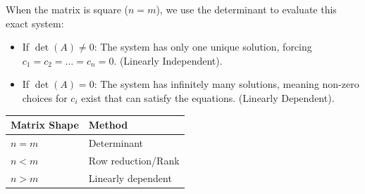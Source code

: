 \documentclass[DIV=20,oneside]{scrartcl}
\begin{document}
When the matrix is square ($n = m$), we use the determinant to evaluate this exact system:
\begin{itemize}
	\item If $\det(A) \neq 0$: The system has only one unique solution, forcing $c_1 = c_2 = \dots = c_n = 0$. (Linearly Independent).
	\item If $\det(A) = 0$: The system has infinitely many solutions, meaning non-zero choices for $c_i$ exist that can satisfy the equations. (Linearly Dependent).
\end{itemize}

\begin{table}[H]
	\centering
	\begin{tabular}{|l|l|}
		\hline
		\textbf{Matrix Shape} & \textbf{Method}\\ \hline
		$n=m$ & Determinant\\ \hline
		$n<m$ & Row reduction/Rank\\ \hline
		$n>m$ & Linearly dependent\\ \hline
	\end{tabular}
\end{table}
\end{document}
